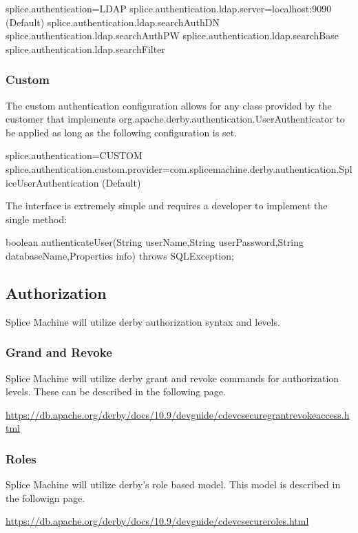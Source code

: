 splice.authentication=LDAP
splice.authentication.ldap.server=localhost:9090 (Default)
splice.authentication.ldap.searchAuthDN
splice.authentication.ldap.searchAuthPW
splice.authentication.ldap.searchBase
splice.authentication.ldap.searchFilter

\subsubsection{Custom}

The custom authentication
configuration allows for any
class provided by the customer
that implements org.apache.derby.authentication.UserAuthenticator
to be applied as long as the following configuration is set.

splice.authentication=CUSTOM
splice.authentication.custom.provider=com.splicemachine.derby.authentication.SpliceUserAuthentication
(Default)

The interface is extremely simple and requires a developer to implement the
single method:

boolean	authenticateUser(String userName,String userPassword,String
databaseName,Properties info) throws SQLException;


\subsection{Authorization}
Splice Machine will utilize derby authorization syntax and levels. 

\subsubsection{Grand and Revoke}

Splice Machine will utilize derby grant and revoke commands for
authorization levels.  These can be described in the following page.

\url{https://db.apache.org/derby/docs/10.9/devguide/cdevcsecuregrantrevokeaccess.html}

\subsubsection{Roles}

Splice Machine will utilize derby's role based model.  This model is described
in the followign page.

\url{https://db.apache.org/derby/docs/10.9/devguide/cdevcsecureroles.html}

